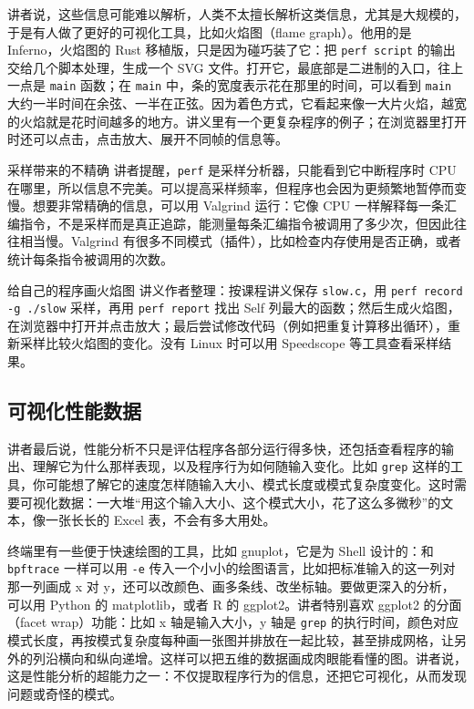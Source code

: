 \documentclass[a4paper]{article}
\begin{document}
讲者说，这些信息可能难以解析，人类不太擅长解析这类信息，尤其是大规模的，于是有人做了更好的可视化工具，比如火焰图（flame graph）。他用的是 Inferno，火焰图的 Rust 移植版，只是因为碰巧装了它：把 \texttt{perf script} 的输出交给几个脚本处理，生成一个 SVG 文件。打开它，最底部是二进制的入口，往上一点是 \texttt{main} 函数；在 \texttt{main} 中，条的宽度表示花在那里的时间，可以看到 \texttt{main} 大约一半时间在余弦、一半在正弦。因为着色方式，它看起来像一大片火焰，越宽的火焰就是花时间越多的地方。讲义里有一个更复杂程序的例子；在浏览器里打开时还可以点击，点击放大、展开不同帧的信息等。

\begin{warningbox}{采样带来的不精确}
讲者提醒，\texttt{perf} 是采样分析器，只能看到它中断程序时 CPU 在哪里，所以信息不完美。可以提高采样频率，但程序也会因为更频繁地暂停而变慢。想要非常精确的信息，可以用 Valgrind 运行：它像 CPU 一样解释每一条汇编指令，不是采样而是真正追踪，能测量每条汇编指令被调用了多少次，但因此往往相当慢。Valgrind 有很多不同模式（插件），比如检查内存使用是否正确，或者统计每条指令被调用的次数。
\end{warningbox}

\begin{practicebox}{给自己的程序画火焰图}
讲义作者整理：按课程讲义保存 \texttt{slow.c}，用 \texttt{perf record -g ./slow} 采样，再用 \texttt{perf report} 找出 Self 列最大的函数；然后生成火焰图，在浏览器中打开并点击放大；最后尝试修改代码（例如把重复计算移出循环），重新采样比较火焰图的变化。没有 Linux 时可以用 Speedscope 等工具查看采样结果。
\end{practicebox}

\subsection{可视化性能数据}

讲者最后说，性能分析不只是评估程序各部分运行得多快，还包括查看程序的输出、理解它为什么那样表现，以及程序行为如何随输入变化。比如 \texttt{grep} 这样的工具，你可能想了解它的速度怎样随输入大小、模式长度或模式复杂度变化。这时需要可视化数据：一大堆“用这个输入大小、这个模式大小，花了这么多微秒”的文本，像一张长长的 Excel 表，不会有多大用处。

终端里有一些便于快速绘图的工具，比如 gnuplot，它是为 Shell 设计的：和 \texttt{bpftrace} 一样可以用 \texttt{-e} 传入一个小小的绘图语言，比如把标准输入的这一列对那一列画成 x 对 y，还可以改颜色、画多条线、改坐标轴。要做更深入的分析，可以用 Python 的 matplotlib，或者 R 的 ggplot2。讲者特别喜欢 ggplot2 的分面（facet wrap）功能：比如 x 轴是输入大小，y 轴是 \texttt{grep} 的执行时间，颜色对应模式长度，再按模式复杂度每种画一张图并排放在一起比较，甚至排成网格，让另外的列沿横向和纵向递增。这样可以把五维的数据画成肉眼能看懂的图。讲者说，这是性能分析的超能力之一：不仅提取程序行为的信息，还把它可视化，从而发现问题或奇怪的模式。
\end{document}
